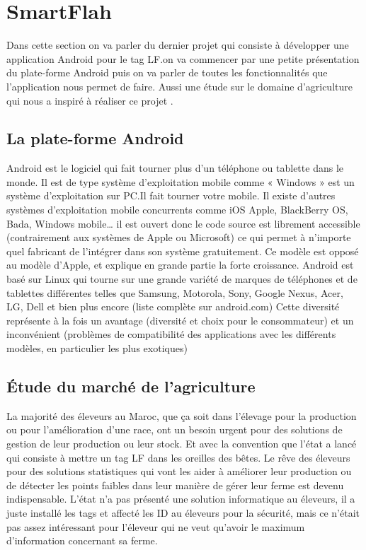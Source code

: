 \documentclass[11pt, a4paper, twoside]{book}
\begin{document}
\section{SmartFlah}
Dans cette section on va parler du dernier projet qui consiste à développer une application Android pour le tag LF.on va commencer par une petite présentation du plate-forme Android puis on va parler de toutes les fonctionnalités que l'application nous permet de faire. Aussi une étude sur le domaine d'agriculture qui nous a inspiré à réaliser ce projet .\\
\subsection{La plate-forme Android}
Android est le logiciel qui fait tourner plus d’un téléphone ou tablette dans le monde.
Il est de type système d’exploitation mobile comme « Windows » est un système d’exploitation sur PC.Il fait tourner votre mobile. Il existe d’autres systèmes d’exploitation mobile concurrents comme iOS Apple, BlackBerry OS, Bada, Windows mobile… il est ouvert donc le code source est librement accessible (contrairement aux systèmes de Apple ou Microsoft) ce qui permet à n’importe quel fabricant de l’intégrer dans son système gratuitement. Ce modèle est opposé au modèle d'Apple, et explique en grande partie la forte croissance. Android est basé sur Linux qui tourne sur une grande variété de marques de téléphones et de tablettes différentes telles que Samsung, Motorola, Sony, Google Nexus, Acer, LG, Dell et bien plus encore (liste complète sur android.com) Cette diversité représente à la fois un avantage (diversité et choix pour le consommateur) et un inconvénient (problèmes de compatibilité des applications avec les différents modèles, en particulier les plus exotiques)
\subsection{Étude du marché de l'agriculture}
La majorité des éleveurs au Maroc, que ça soit dans l'élevage pour la production ou pour l'amélioration d'une race, ont un besoin urgent pour des solutions de gestion de leur production ou leur stock. Et avec la convention que l'état a lancé qui consiste à mettre un tag LF dans les oreilles des bêtes. Le rêve des éleveurs pour des solutions statistiques qui vont les aider à améliorer leur production ou de détecter les points faibles dans leur manière de gérer leur ferme est devenu indispensable. L'état n'a pas présenté une solution informatique au éleveurs, il a juste installé les tags et affecté les ID au éleveurs pour la sécurité, mais ce n'était pas assez intéressant pour l’éleveur qui ne veut qu'avoir le maximum d'information concernant sa ferme.\\
\end{document}
